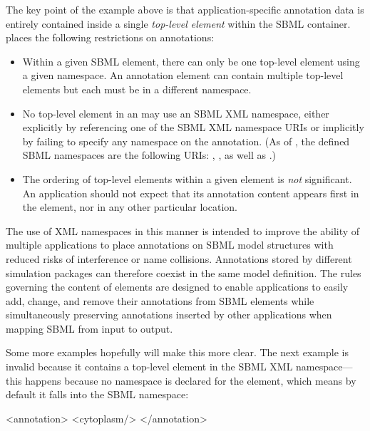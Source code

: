 The key point of the example above is that application-specific
annotation data is entirely contained inside a single
\emph{top-level element} within the SBML 
container.  \sbmltwotwo places the following restrictions on
annotations:
\begin{itemize}

\item Within a given SBML  element, there can
  only be one top-level element using a given namespace.  An
  annotation element can contain multiple top-level elements but
  each must be in a different namespace.

\item No top-level element in an  may use an
  SBML XML namespace, either explicitly by referencing one of the
  SBML XML namespace URIs or implicitly by failing to specify any
  namespace on the annotation.  (As of \sbmltwotwo, the defined
  SBML namespaces are the following URIs:
  ,
  , as well as
  .)

\item The ordering of top-level elements within a given
   element is \emph{not} significant.  An
  application should not expect that its annotation content
  appears first in the  element, nor in any
  other particular location.

\end{itemize}

The use of XML namespaces in this manner is intended to improve
the ability of multiple applications to place annotations on SBML
model structures with reduced risks of interference or name
collisions.  Annotations stored by different simulation packages
can therefore coexist in the same model definition.  The rules
governing the content of  elements are designed
to enable applications to easily add, change, and remove their
annotations from SBML elements while simultaneously preserving
annotations inserted by other applications when mapping SBML from
input to output.

Some more examples hopefully will make this more clear.  The next
example is invalid because it contains a top-level element in the
SBML XML namespace---this happens because no namespace is declared
for the  element, which means by default it
falls into the SBML namespace:

\begin{example}
<annotation>
    <cytoplasm/>
</annotation>
\end{example}

